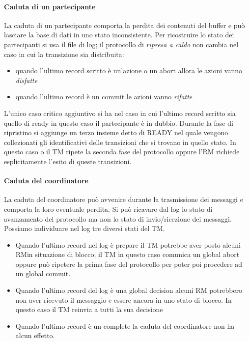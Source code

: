\paragraph{Caduta di un partecipante} La caduta di un partecipante comporta la perdita dei contenuti del buffer e può lasciare la base di dati in uno stato inconsistente. Per ricostruire lo stato dei partecipanti si usa il file di log; il protocollo di \emph{ripresa a caldo} non cambia nel caso in cui la transizione sia distribuita:
\begin{itemize}
\item quando l'ultimo record scritto è un'azione o un \textsf{abort} allora le azioni vanno \emph{disfatte}
\item quando l'ultimo record è un \textsf{commit} le azioni vanno \emph{rifatte}
\end{itemize}
L'unico caso critico aggiuntivo si ha nel caso in cui l'ultimo record scritto sia quello di \textsf{ready} in questo caso il partecipante è in dubbio.
Durante la fase di ripristino si aggiunge un terzo insieme detto di READY nel quale vengono collezionati gli identificativi delle transizioni che si trovano in quello stato. In questo caso o il TM ripete la seconda fase del protocollo oppure l'RM richiede esplicitamente l'esito di queste transizioni.
\paragraph{Caduta del coordinatore} La caduta del coordinatore può avvenire durante la trasmissione dei messaggi e comporta la loro eventuale perdita. Si può ricavare dal log lo stato di avanzamento del protocollo ma non lo stato di invio/ricezione dei messaggi. Possiamo individuare nel log tre diversi stati del TM.
\begin{itemize}
\item Quando l'ultimo record nel log è \textsf{prepare} il TM potrebbe aver posto alcuni RMin situazione di blocco; il TM in questo caso comunica un \textsf{global abort} oppure può ripetere la prima fase del protocollo per poter poi procedere ad un \textsf{global commit}.
\item Quando l'ultimo record del log è una \textsf{global decision} alcuni RM potrebbero non aver ricevuto il messaggio e essere ancora in uno stato di blocco. In questo caso il TM reinvia a tutti la sua decisione
\item Quando l'ultimo record è un \textsf{complete} la caduta del coordinatore non ha alcun effetto.
\end{itemize}
